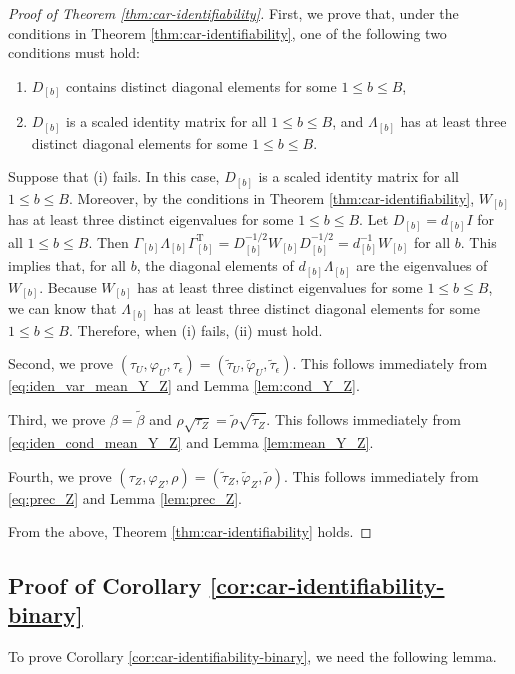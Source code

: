 \documentclass[11pt]{article}
\theoremstyle{definition}
\theoremstyle{remark}
\def\top{{ \mathrm{\scriptscriptstyle T} }}
\begin{document}
\begin{proof}[Proof of Theorem \ref{thm:car-identifiability}]
First, we prove that, under the conditions in Theorem \ref{thm:car-identifiability}, one of the following two conditions must hold:  
\begin{enumerate}[label=(\roman*)]
    \item $D_{[b]}$ contains distinct diagonal elements for some $1\le b \le B$, 
    \item $D_{[b]}$ is a scaled identity matrix for all $1\le b \le B$, 
    and 
    $\Lambda_{[b]}$ has at least three distinct diagonal elements for some $1\le b \le B$.
\end{enumerate}
Suppose that (i) fails. In this case, 
$D_{[b]}$ is a scaled identity matrix for all $1\le b \le B$. 
Moreover, by the conditions in Theorem \ref{thm:car-identifiability}, $W_{[b]}$ has at least three distinct eigenvalues for some $1\le b \le B$. 
Let $D_{[b]} = d_{[b]} I$ for all $1 \le b \le B$. Then
$\Gamma_{[b]} \Lambda_{[b]} \Gamma_{[b]}^\top = D_{[b]}^{-1/2} W_{[b]} D_{[b]}^{-1/2} = d_{[b]}^{-1} W_{[b]}$ for all $b$. 
This implies that, for all $b$, the diagonal elements of $d_{[b]}\Lambda_{[b]}$ are the eigenvalues of $W_{[b]}$. 
Because $W_{[b]}$ has at least three distinct eigenvalues for some $1\le b\le B$, we can know that $\Lambda_{[b]}$ has at least three distinct diagonal elements for some $1\le b \le B$. Therefore, when (i) fails, (ii) must hold.

Second, we prove $(\tau_U, \varphi_U, \tau_{\epsilon}) = (\tilde{\tau}_U, \tilde{\varphi}_U, \tilde{\tau}_{\epsilon})$. 
This follows immediately from \eqref{eq:iden_var_mean_Y_Z} and Lemma \ref{lem:cond_Y_Z}. 

Third, we prove $\beta = \tilde{\beta}$ and $\rho \sqrt{\tau_Z} = \tilde{\rho} \sqrt{\tilde{\tau}_Z}$. This follows immediately from \eqref{eq:iden_cond_mean_Y_Z} and Lemma \ref{lem:mean_Y_Z}.

Fourth, we prove $(\tau_Z, \varphi_Z, \rho)=(\tilde{\tau}_Z, \tilde{\varphi}_Z, \tilde{\rho})$. This follows immediately from \eqref{eq:prec_Z} and Lemma \ref{lem:prec_Z}. 

From the above, Theorem \ref{thm:car-identifiability} holds.  
\end{proof}


\subsection{Proof of Corollary \ref{cor:car-identifiability-binary}}

To prove Corollary \ref{cor:car-identifiability-binary}, 
we need the following lemma.
\end{document}
